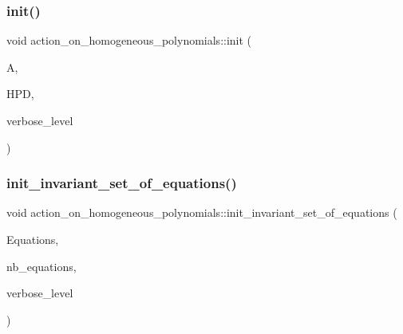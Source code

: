\mbox{\label{classaction__on__homogeneous__polynomials_aeb2f13aba300d45eafb7fc4bc64711ac}} 
\subsubsection{\texorpdfstring{init()}{init()}}
{\footnotesize\ttfamily void action\+\_\+on\+\_\+homogeneous\+\_\+polynomials\+::init (\begin{DoxyParamCaption}\item[{\mbox{\hyperlink{classaction}{action}} $\ast$}]{A,  }\item[{\mbox{\hyperlink{classhomogeneous__polynomial__domain}{homogeneous\+\_\+polynomial\+\_\+domain}} $\ast$}]{H\+PD,  }\item[{\mbox{\hyperlink{galois_8h_a09fddde158a3a20bd2dcadb609de11dc}{I\+NT}}}]{verbose\+\_\+level }\end{DoxyParamCaption})}

\mbox{\label{classaction__on__homogeneous__polynomials_a94f2f869d6240110d3fe5914c022753c}} 
\subsubsection{\texorpdfstring{init\+\_\+invariant\+\_\+set\+\_\+of\+\_\+equations()}{init\_invariant\_set\_of\_equations()}}
{\footnotesize\ttfamily void action\+\_\+on\+\_\+homogeneous\+\_\+polynomials\+::init\+\_\+invariant\+\_\+set\+\_\+of\+\_\+equations (\begin{DoxyParamCaption}\item[{\mbox{\hyperlink{galois_8h_a09fddde158a3a20bd2dcadb609de11dc}{I\+NT}} $\ast$}]{Equations,  }\item[{\mbox{\hyperlink{galois_8h_a09fddde158a3a20bd2dcadb609de11dc}{I\+NT}}}]{nb\+\_\+equations,  }\item[{\mbox{\hyperlink{galois_8h_a09fddde158a3a20bd2dcadb609de11dc}{I\+NT}}}]{verbose\+\_\+level }\end{DoxyParamCaption})}

